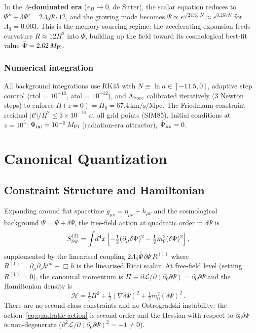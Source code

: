 \documentclass[12pt,a4paper]{article}
\newcommand{\Psibar}{\bar\Psi}
\newcommand{\Lz}{\Lambda_0}
\newcommand{\Mpl}{M_{\rm Pl}}
\begin{document}
In the \textbf{$\Lambda$-dominated era} ($\varepsilon_H \to 0$, de Sitter),
the scalar equation reduces to $\Psi'' + 3\Psi' = 2\Lz\Psi\cdot12$, and the
growing mode becomes $\Psi \propto e^{\sqrt{24\Lz}\,N} \approx e^{0.267N}$ for
$\Lz = 0.003$. This is the memory-sourcing regime: the accelerating expansion
feeds curvature $R \approx 12H^2$ into $\Psi$, building up the field toward
its cosmological best-fit value $\Psibar = 2.62\,\Mpl$.

\subsubsection*{Numerical integration}

All background integrations use RK45 with $N \equiv \ln a \in [-11.5, 0]$,
adaptive step control (rtol = $10^{-10}$, atol = $10^{-12}$), and
$\Lambda_{\rm bare}$ calibrated iteratively (3 Newton steps) to enforce
$H(z=0) = H_0 = 67.4\,\mathrm{km/s/Mpc}$. The Friedmann constraint residual
$|\mathcal{C}|/H^2 \leq 3\times10^{-16}$ at all grid points (SIM85).
Initial conditions at $z = 10^5$: $\Psi_{\rm ini} = 10^{-3}\,\Mpl$ (radiation-era
attractor), $\dot\Psi_{\rm ini} = 0$.

\section{Canonical Quantization}
\label{sec:quantization}

\subsection{Constraint Structure and Hamiltonian}
\label{sec:hamiltonian}

Expanding around flat spacetime $g_{\mu\nu} = \eta_{\mu\nu} + h_{\mu\nu}$
and the cosmological background $\Psi = \Psibar + \delta\Psi$, the
free-field action at quadratic order in $\delta\Psi$ is
\begin{equation}
  S_{\delta\Psi}^{(2)} = \int\!d^4x\,\Bigl[
    -\tfrac{1}{2}(\partial_\mu\delta\Psi)^2 - \tfrac{1}{2}m_0^2(\delta\Psi)^2
  \Bigr]\,,
  \label{eq:quadratic-action}
\end{equation}
supplemented by the linearised coupling $2\Lz\Psibar\,\delta\Psi\,R^{(1)}$
where $R^{(1)} = \partial_\mu\partial_\nu h^{\mu\nu} - \Box h$ is the
linearised Ricci scalar. At free-field level (setting $R^{(1)} = 0$),
the canonical momentum is $\Pi \equiv \partial\mathcal{L}/\partial(\partial_0\delta\Psi)
= \partial_0\delta\Psi$ and the Hamiltonian density is
\begin{equation}
  \mathcal{H} = \tfrac{1}{2}\Pi^2 + \tfrac{1}{2}(\nabla\delta\Psi)^2
  + \tfrac{1}{2}m_0^2(\delta\Psi)^2\,.
\end{equation}
There are no second-class constraints and no Ostrogradski instability:
the action~\eqref{eq:quadratic-action} is second-order and the Hessian
with respect to $\partial_0\delta\Psi$ is non-degenerate
($\partial^2\mathcal{L}/\partial(\partial_0\delta\Psi)^2 = -1 \neq 0$).
\end{document}

